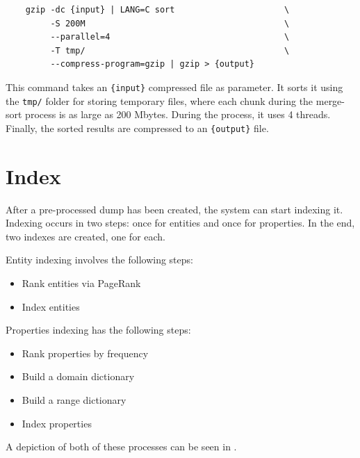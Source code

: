 \begin{verbatim}
    gzip -dc {input} | LANG=C sort                      \
         -S 200M                                        \
         --parallel=4                                   \
         -T tmp/                                        \
         --compress-program=gzip | gzip > {output}
\end{verbatim}

This command takes an \texttt{\{input\}} compressed file as parameter. It sorts it using the \texttt{tmp/} folder for storing temporary files, where each chunk during the merge-sort process is as large as 200 Mbytes. During the process, it uses 4 threads. Finally, the sorted results are compressed to an \texttt{\{output\}} file.


\section{Index}
\label{chap:index}

After a pre-processed dump has been created, the system can start indexing it. 
Indexing occurs in two steps: once for entities and once for properties. In the end, two indexes are created, one for each.

Entity indexing involves the following steps:
\begin{itemize}
    \item Rank entities via PageRank
    \item Index entities
\end{itemize}

Properties indexing has the following steps:
\begin{itemize}
    \item Rank properties by frequency
    \item Build a domain dictionary
    \item Build a range dictionary
    \item Index properties
\end{itemize}

A depiction of both of these processes can be seen in .

